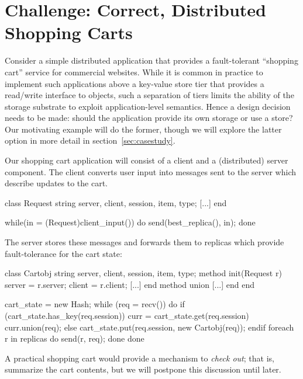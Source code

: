 \section{Challenge: Correct, Distributed Shopping Carts}

Consider a simple distributed application that provides a fault-tolerant
``shopping cart'' service for commercial websites.  While it is common in
practice to implement such applications above a key-value store tier that
provides a read/write interface to objects, such a separation of tiers limits
the ability of the storage substrate to exploit application-level semantics.
Hence a design decision needs to be made: should the application provide 
its own storage or use a store?  Our motivating example will do the former,
though we will explore the latter option in more detail in section~\ref{sec:casestudy}.

Our shopping cart application will consist of a client and a (distributed)
server component.  The client converts user input into messages sent to
the server which describe updates to the cart.   

\begin{Dedalus}
class Request
  string server, client, session, item, type;
  [...]
end

while(in = (Request)client_input()) do
  send(best_replica(), in);
done
\end{Dedalus}

The server stores these messages
and forwards them to replicas which provide fault-tolerance for the cart state:


\begin{Dedalus}
class Cartobj
  string server, client, session, item, type;
  method init(Request r)
    server = r.server;
    client = r.client;
    [...]
  end
  method union
    [...]
  end
end

cart_state = new Hash;
while (req = recv()) do
  if (cart_state.has_key(req.session)) 
    curr = cart_state.get(req.session)
    curr.union(req);
  else 
    cart_state.put(req.session, new Cartobj(req));
  endif
  foreach r in replicas do
    send(r, req);
  done
done
\end{Dedalus}
A practical shopping cart would provide a mechanism to {\em check out}; that is,
summarize the cart contents, but we will postpone this discussion until later.

